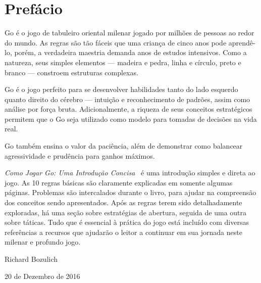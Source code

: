 \chapter{Prefácio}

Go é o jogo de tabuleiro oriental milenar jogado por milhões de pessoas ao redor do mundo. As regras são tão fáceis que uma criança de cinco anos pode aprendê-lo, porém, a verdadeira maestria demanda anos de estudos intensivos. Como a natureza, seus simples elementos --- madeira e pedra, linha e círculo, preto e branco --- constroem estruturas complexas.

Go é o jogo perfeito para se desenvolver habilidades tanto do lado esquerdo quanto direito do cérebro --- intuição e reconhecimento de padrões, assim como análise por força bruta. Adicionalmente, a riqueza de seus conceitos estratégicos permitem que o Go seja utilizado como modelo para tomadas de decisões na vida real.

Go também ensina o valor da paciência, além de demonstrar como balancear agressividade e prudência para ganhos máximos.

\bigskip

\emph{Como Jogar Go: Uma Introdução Concisa}~\cite{bozulich_how_to_play_go} é uma introdução simples e direta ao jogo. As 10 regras básicas são claramente explicadas em somente algumas páginas. Problemas são intercalados durante o livro, para ajudar na compreensão dos conceitos sendo apresentados. Após as regras terem sido detalhadamente exploradas, há uma seção sobre estratégias de abertura, seguida de uma outra sobre táticas. Tudo que é essencial à prática do jogo está incluído com diversas referências a recursos que ajudarão o leitor a continuar em sua jornada neste milenar e profundo jogo.

\bigskip
\bigskip

Richard Bozulich

20 de Dezembro de 2016